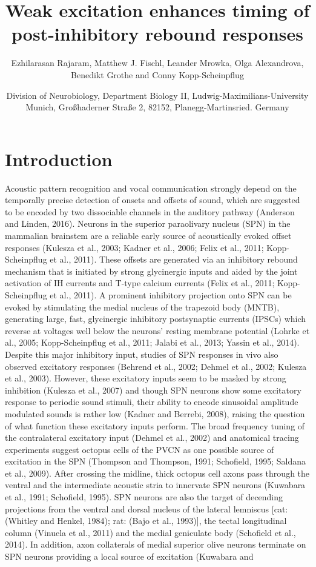 \documentclass{article}
\begin{document}
\title{Weak excitation enhances timing of post-inhibitory rebound responses}
\maketitle
\author{Ezhilarasan Rajaram, Matthew J. Fischl, Leander Mrowka, Olga Alexandrova, Benedikt Grothe and Conny Kopp-Scheinpflug}

\date{Division of Neurobiology, Department Biology II, Ludwig-Maximilians-University Munich, Großhaderner Straße 2, 82152, Planegg-Martinsried. Germany}

\section{Introduction}
Acoustic pattern recognition and vocal communication strongly depend on the temporally precise detection of onsets and offsets of sound, which are suggested to be encoded by two dissociable channels in the auditory pathway (Anderson and Linden, 2016). Neurons in the superior paraolivary nucleus (SPN) in the mammalian brainstem are a reliable early source of acoustically evoked offset responses (Kulesza et al., 2003; Kadner et al., 2006; Felix et al., 2011; Kopp-Scheinpflug et al., 2011). These offsets are generated via an inhibitory rebound mechanism that is initiated by strong glycinergic inputs and aided by the joint activation of IH currents and T-type calcium currents (Felix et al., 2011; Kopp-Scheinpflug et al., 2011). A prominent inhibitory projection onto SPN can be evoked by stimulating the medial nucleus of the trapezoid body (MNTB), generating large, fast, glycinergic inhibitory postsynaptic currents (IPSCs) which reverse at voltages well below the neurons’ resting membrane potential (Lohrke et al., 2005; Kopp-Scheinpflug et al., 2011; Jalabi et al., 2013; Yassin et al., 2014). Despite this major inhibitory input, studies of SPN responses in vivo also observed excitatory responses (Behrend et al., 2002; Dehmel et al., 2002; Kulesza et al., 2003). However, these excitatory inputs seem to be masked by strong inhibition (Kulesza et al., 2007) and though SPN neurons show some excitatory response to periodic sound stimuli, their ability to encode sinusoidal amplitude modulated sounds is rather low (Kadner and Berrebi, 2008), raising the question of what function these excitatory inputs perform. The broad frequency tuning of the contralateral excitatory input (Dehmel et al., 2002) and anatomical tracing experiments suggest octopus cells of the PVCN as one possible source of excitation in the SPN (Thompson and Thompson, 1991; Schofield, 1995; Saldana et al., 2009). After crossing the midline, thick octopus cell axons pass through the ventral and the intermediate acoustic stria to innervate SPN neurons (Kuwabara et al., 1991; Schofield, 1995). SPN neurons are also the target of decending projections from the ventral and dorsal nucleus of the lateral lemniscus [cat: (Whitley and Henkel, 1984); rat: (Bajo et al., 1993)], the tectal longitudinal column (Vinuela et al., 2011) and the medial geniculate body (Schofield et al., 2014). In addition, axon collaterals of medial superior olive neurons terminate on SPN neurons providing a local source of excitation (Kuwabara and 
\end{document}
